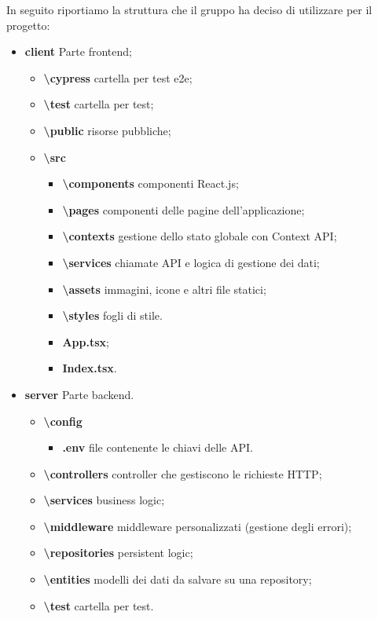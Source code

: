 In seguito riportiamo la struttura che il gruppo ha deciso di utilizzare per il progetto:
\begin{itemize}
    \item \textbf{client} Parte frontend;
    \begin{itemize}
        \item \textbf{\textbackslash cypress} cartella per test e2e;
        \item \textbf{\textbackslash test} cartella per test;
        \item \textbf{\textbackslash public} risorse pubbliche;
        \item \textbf{\textbackslash src}
        \begin{itemize}
            \item \textbf{\textbackslash components} componenti React.js;
            \item \textbf{\textbackslash pages} componenti delle pagine dell'applicazione;
            \item \textbf{\textbackslash contexts} gestione dello stato globale con Context API;
            \item \textbf{\textbackslash services} chiamate API e logica di gestione dei dati;
            \item \textbf{\textbackslash assets} immagini, icone e altri file statici;
            \item \textbf{\textbackslash styles} fogli di stile.
            \item \textbf{App.tsx};
            \item \textbf{Index.tsx}.
        \end{itemize}
    \end{itemize}
    \item \textbf{server} Parte backend.
    \begin{itemize}
        \item \textbf{\textbackslash config}
        \begin{itemize}
            \item \textbf{.env } file contenente le chiavi delle API.
        \end{itemize}
        \item \textbf{\textbackslash controllers} controller che gestiscono le richieste HTTP;
        \item \textbf{\textbackslash services} business logic;
        \item \textbf{\textbackslash middleware} middleware personalizzati (gestione degli errori);
        \item \textbf{\textbackslash repositories} persistent logic;
        \item \textbf{\textbackslash entities} modelli dei dati da salvare su una repository;
        \item \textbf{\textbackslash test} cartella per test.
    \end{itemize}
\end{itemize}


